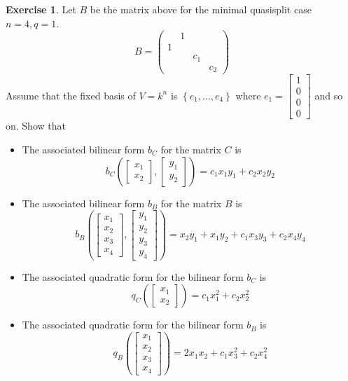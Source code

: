 \documentclass[12pt]{article}
\theoremstyle{definition}
\newtheorem{exercise}[theorem]{Exercise}
\numberwithin{theorem}{subsection}
\newcommand{\lp}{\left(}
\newcommand{\rp}{\right)}
\newcommand{\lb}{\left\{}
\newcommand{\rb}{\right\}}
\DeclareMathOperator{\diag}{diag}
\begin{document}
\begin{exercise}
Let $B$ be the matrix above for the minimal quasisplit case $n=4, q=1$. 
\[
	B =
	\begin{pmatrix}
		& 1 \\
		1 &  \\
		&& c_1 \\
		&&& c_2
	\end{pmatrix}
\]
Assume that the fixed basis of $V = k^n$ is $\lb e_1, \ldots, e_4 \rb$ where $e_1 = \begin{bmatrix}1 \\0 \\ 0 \\0 \end{bmatrix}$ and so on. Show that
\begin{itemize}
	\item The associated bilinear form $b_C$ for the matrix $C$ is
	\[
		b_C \lp \begin{bmatrix}
			x_1 \\
			x_2
		\end{bmatrix}
		,
		\begin{bmatrix}
			y_1 \\
			y_2
		\end{bmatrix}
		 \rp
		 = c_1 x_1 y_1 + c_2 x_2 y_2		 
	\]
	\item The associated bilinear form $b_B$ for the matrix $B$ is
	\[
		b_B
		\lp
		\begin{bmatrix}
			x_1 \\
			x_2 \\
			x_3 \\
			x_4 
		\end{bmatrix}
		,
		\begin{bmatrix}
			y_1 \\
			y_2 \\
			y_3 \\
			y_4 
		\end{bmatrix}
		\rp
		= x_2 y_1 + x_1 y_2 + c_1 x_3 y_3 + c_2 x_4 y_4
	\]
	\item The associated quadratic form for the bilinear form $b_C$ is
	\[
		q_C \lp
		\begin{bmatrix}
			x_1 \\
			x_2
		\end{bmatrix}
		\rp
		= c_1 x_1^2 + c_2 x_2^2
	\]
	\item The associated quadratic form for the bilinear form $b_B$ is
	\[
		q_B \lp
		\begin{bmatrix}
			x_1 \\
			x_2 \\
			x_3 \\
			x_4
		\end{bmatrix}
		\rp
		= 2x_1 x_2 + c_1 x_3^2 + c_2 x_4^2
	\]
\end{itemize}
\end{exercise}
\end{document}
